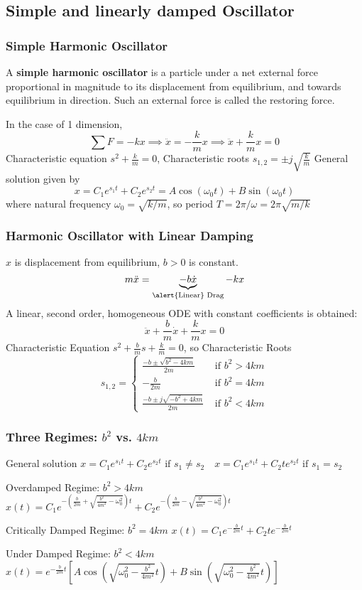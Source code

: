 \subsection{Simple and linearly damped Oscillator}
\begin{frame}
\frametitle{Simple Harmonic Oscillator}
\begin{definition}
A \alert{\textbf{simple harmonic oscillator}} is a particle under a \alert{net external force} proportional in magnitude to its displacement from equilibrium, and towards equilibrium in direction. Such an external force is called the \alert{restoring force}.
\end{definition}
In the case of 1 dimension,
\[
\sum F=-kx\implies\ddot x=-\frac{k}{m}x\implies\ddot x+\frac{k}{m}x=0
\]
\alert{Characteristic equation} $s^2+\frac{k}{m}=0$, \alert{Characteristic roots} $s_{1,2}=\pm j\sqrt{\frac{k}{m}}$ \alert{General solution} given by
\[
x=C_1 e^{s_1 t}+C_2 e^{s_2 t}=A\cos(\omega_0 t)+B\sin(\omega_0 t)
\]
where \alert{natural frequency }$\omega_0=\sqrt{k/m}$, so \alert{period} $T=2\pi/\omega=2\pi\sqrt{m/k}$
\end{frame}
\begin{frame}
\frametitle{Harmonic Oscillator with Linear Damping}
$x$ is \alert{displacement} from equilibrium, $b>0$ is constant.
\[m\ddot x=\underbrace{-b\dot x}_{\text{\alert{Linear} Drag}}-kx\]
A linear, second order, homogeneous ODE with constant coefficients is obtained:
\[\ddot x+\frac{b}{m}\dot x+\frac{k}{m}x=0\]
\alert{Characteristic Equation} $s^2+\frac{b}{m}s+\frac{k}{m}=0$, so \alert{Characteristic Roots}\[s_{1,2}=\begin{cases}
\frac{-b\pm\sqrt{b^2-4km}}{2m}&\text{ if }b^2>4km\\
-\frac{b}{2m}&\text{ if }b^2=4km\\
\frac{-b\pm j\sqrt{-b^2+4km}}{2m}&\text{ if } b^2<4km
\end{cases}\]
\end{frame}
\begin{frame}
\frametitle{Three Regimes: $b^2$ vs. $4km$}
\begin{block}{General solution}
$x=C_1 e^{s_1 t}+ C_2 e^{s_2 t}\text{ if }s_1\neq s_2\quad x=C_1 e^{s_1 t}+C_2 te^{s_2 t}\text{ if }s_1= s_2$
\end{block}
\begin{block}{Overdamped Regime: $b^2>4km$}
$x(t)=C_1 e^{-\left(\frac{b}{2m}+\sqrt{\frac{b^2}{4m^2}-\omega_0^2}\right)t}+C_2 e^{-\left(\frac{b}{2m}-\sqrt{\frac{b^2}{4m^2}-\omega_0^2}\right)t}$
\end{block}
\begin{block}{Critically Damped Regime: $b^2=4km$}
$x(t)=C_1e^{-\frac{b}{2m}t}+C_2te^{-\frac{b}{2m}t}$
\end{block}
\begin{block}{Under Damped Regime: $b^2<4km$}
$x(t)=e^{-\frac{b}{2m}t}\left[A\cos\left(\sqrt{\omega_0^2-\frac{b^2}{4m^2}}t\right)+B\sin\left(\sqrt{\omega_0^2-\frac{b^2}{4m^2}}t\right)\right]$
\end{block}
\end{frame}
